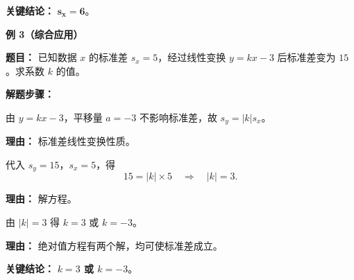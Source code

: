 \begin{examplebox}
	\textbf{\textcolor{CExample}{关键结论：}}
	\textbf{$\mathbf{s_x = 6}$}。

	\medskip
	\textbf{\textcolor{CExample}{例 3（综合应用）}}

	\textbf{\textcolor{CExample}{题目：}}
	已知数据 $x$ 的标准差 $s_x = 5$，经过线性变换 $y = kx - 3$ 后标准差变为 $15$。求系数 $k$ 的值。

	\textbf{\textcolor{CExample}{解题步骤：}}
	\begin{description}[style=nextline, leftmargin=2.8em, labelsep=0.5em, itemsep=0.45em]
		\item[\textbf{第一步（写出关系式）：}] 由 $y = kx - 3$，平移量 $a = -3$ 不影响标准差，故 $s_y = |k| s_x$。
		      \par\textbf{理由：} 标准差线性变换性质。
		\item[\textbf{第二步（代入已知）：}]
		      代入 $s_y = 15$，$s_x = 5$，得
		      \[
			      15 = |k| \times 5 \quad\Rightarrow\quad |k| = 3 .
		      \]
		      \par\textbf{理由：} 解方程。
		\item[\textbf{第三步（求系数）：}] 由 $|k| = 3$ 得 $k = 3$ 或 $k = -3$。
		      \par\textbf{理由：} 绝对值方程有两个解，均可使标准差成立。
	\end{description}

	\textbf{\textcolor{CExample}{关键结论：}}
	\textbf{$k = 3$ 或 $k = -3$}。

\end{examplebox}